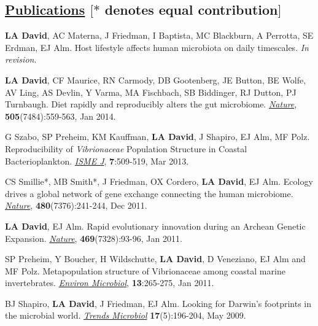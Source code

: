 \documentclass[overlapped,line,11pt]{res}
\begin{document}
\begin{resume}
\section{\underline{\sc Publications} \hspace{2.95in} \sc $[\ast$ denotes equal
      contribution$]$}

\vspace{.25in}

\begin{revnumerate}[11]

\item {\textbf{LA David}, AC Materna, J Friedman, I Baptista, MC
  Blackburn, A Perrotta, SE Erdman, EJ Alm.  Host lifestyle affects
  human microbiota on daily timescales.  \emph{In revision}.}

\item {\textbf{LA David}, CF Maurice, RN Carmody, DB Gootenberg, JE
  Button, BE Wolfe, AV Ling, AS Devlin, Y Varma, MA Fischbach, SB
  Biddinger, RJ Dutton, PJ Turnbaugh.  Diet rapidly and reproducibly
  alters the gut microbiome. \emph{\underline{Nature}},
  \textbf{505}(7484):559-563, Jan 2014.}

\item {G Szabo, SP Preheim, KM Kauffman, \textbf{LA David}, J Shapiro,
  EJ Alm, MF Polz.  Reproducibility of \emph{Vibrionaceae} Population
  Structure in Coastal Bacterioplankton. \emph{\underline{ISME J}},
  \textbf{7}:509-519, Mar 2013.}

\item {CS Smillie*, MB Smith*, J Friedman, OX Cordero, \textbf{LA
    David}, EJ Alm.  Ecology drives a global network of gene exchange
  connecting the human microbiome. \emph{\underline{Nature}},
  \textbf{480}(7376):241-244, Dec 2011.}

\item {\textbf{LA David}, EJ Alm.  Rapid evolutionary innovation during
  an Archean Genetic Expansion.  \emph{\underline{Nature}},
  \textbf{469}(7328):93-96, Jan 2011.}

\vspace*{1mm}
\item {SP Preheim, Y Boucher, H Wildschutte, \textbf{LA David},
  D Veneziano, EJ Alm and MF Polz.  Metapopulation
  structure of Vibrionaceae among coastal marine
  invertebrates. \emph{\underline{Environ Microbiol}}, \textbf{13}:265-275, Jan 2011.} 

\vspace*{1mm}
\item {BJ Shapiro, \textbf{LA David}, J Friedman, EJ Alm. Looking for
Darwin's footprints in the microbial world.  \emph{\underline{Trends Microbiol}}
\textbf{17}(5):196-204, May 2009.}


\end{revnumerate}
\end{resume}
\end{document}
